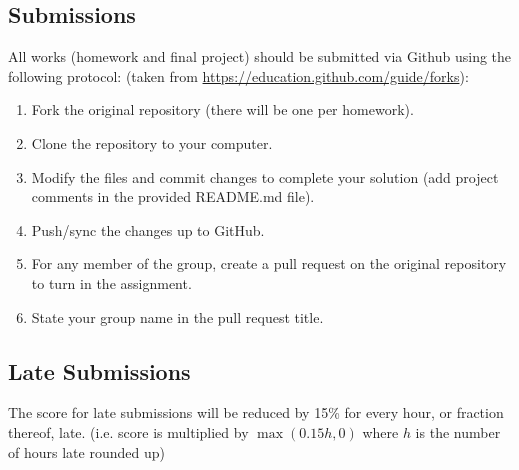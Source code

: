 \documentclass[10pt]{article}
\begin{document}
\subsection{Submissions}
All works (homework and final project) should be submitted via Github using the following protocol: (taken from \url{https://education.github.com/guide/forks}):
\begin{enumerate}[noitemsep]
	\item Fork the original repository (there will be one per homework).
	\item Clone the repository to your computer.
	\item Modify the files and commit changes to complete your solution (add project comments in the provided README.md file).
	\item Push/sync the changes up to GitHub.
	\item For any member of the group, create a pull request on the original repository to turn in the assignment.
	\item State your group name in the pull request title.
\end{enumerate}


\subsection{Late Submissions}
The score for late submissions will be reduced by 15\% for every hour, or fraction thereof, late. (i.e. score is multiplied by $\max(0.15h,0)$ where $h$ is the number of hours late rounded up)
\end{document}
